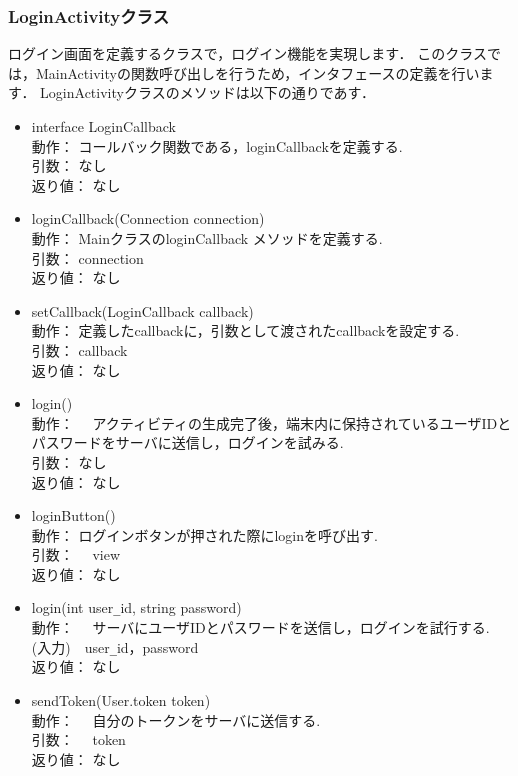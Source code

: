 \documentclass[a4j,titlepage]{jarticle}
\begin{document}
\subsubsection{LoginActivityクラス}
ログイン画面を定義するクラスで，ログイン機能を実現します．
このクラスでは，MainActivityの関数呼び出しを行うため，インタフェースの定義を行います．
LoginActivityクラスのメソッドは以下の通りであす．
\begin{itemize}
\item  interface LoginCallback \\
  動作： コールバック関数である，loginCallbackを定義する.\\
    引数： なし\\
    返り値： なし

  \item loginCallback(Connection connection)\\
    動作： MainクラスのloginCallback メソッドを定義する.\\
    引数： connection\\
    返り値： なし

  
  \item setCallback(LoginCallback callback)\\
  動作：  定義したcallbackに，引数として渡されたcallbackを設定する.\\
  引数：  callback\\
  返り値： なし

  \item login()\\
  動作： 　アクティビティの生成完了後，端末内に保持されているユーザIDとパスワードをサーバに送信し，ログインを試みる.\\
  引数： なし\\
  返り値： なし
  
\item loginButton()\\
動作：  ログインボタンが押された際にloginを呼び出す.\\
  引数： 　view\\
  返り値： なし

\item login(int user\verb|_|id, string password)\\
  動作： 　サーバにユーザIDとパスワードを送信し，ログインを試行する.\\
  (入力)　user\verb|_|id，password\\
  返り値： なし

  \item sendToken(User.token token)\\
  動作： 　自分のトークンをサーバに送信する.\\
  引数： 　token\\
  返り値： なし
  

\end{itemize}
\end{document}
